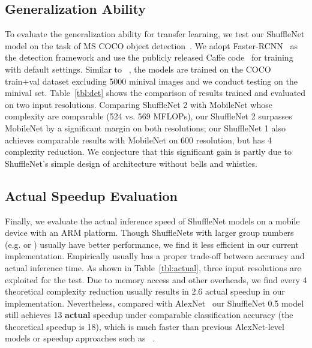 \documentclass[10pt,twocolumn,letterpaper]{article}
\begin{document}
\subsection{Generalization Ability}
To evaluate the generalization ability for transfer learning, we test our ShuffleNet model on the task of MS COCO object detection~\cite{lin2014microsoft}. We adopt Faster-RCNN~\cite{ren2015faster} as the detection framework and use the publicly released Caffe code~\cite{ren2015faster,jia2014caffe} for training with default settings. Similar to ~\cite{howard2017mobilenets}, the models are trained on the COCO train+val dataset excluding 5000 minival images and we conduct testing on the minival set. Table~\ref{tbl:det} shows the comparison of results trained and evaluated on two input resolutions. Comparing ShuffleNet 2 with MobileNet whose complexity are comparable (524 vs. 569 MFLOPs), our ShuffleNet 2 surpasses MobileNet by a significant margin on both resolutions; our ShuffleNet 1 also achieves comparable results with MobileNet on 600 resolution, but has 4 complexity reduction. We conjecture that this significant gain is partly due to ShuffleNet's simple design of architecture without bells and whistles.  


\subsection{Actual Speedup Evaluation}
\label{sec:actual}

Finally, we evaluate the actual inference speed of ShuffleNet models on a mobile device with an ARM platform. Though ShuffleNets with larger group numbers (e.g.  or ) usually have better performance, we find it less efficient in our current implementation. Empirically  usually has a proper trade-off between accuracy and actual inference time. As shown in Table~\ref{tbl:actual}, three input resolutions are exploited for the test. Due to memory access and other overheads, we find every 4 theoretical complexity reduction usually results in 2.6 actual speedup in our implementation. Nevertheless, compared with AlexNet~\cite{krizhevsky2012imagenet} our ShuffleNet 0.5 model still achieves 13 \textbf{actual} speedup under comparable classification accuracy (the theoretical speedup is 18), which is much faster than previous AlexNet-level models or speedup approaches such as ~\cite{iandola2016squeezenet,jaderberg2014speeding,lebedev2014speeding,zhang2016accelerating,zhang2015efficient,wen2016learning}. 





{\small


}
\end{document}
